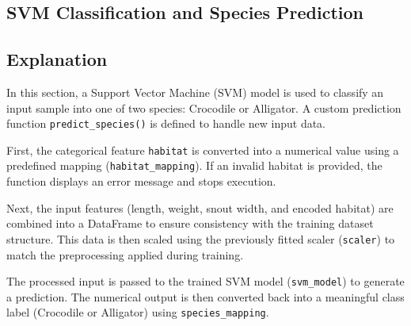 \documentclass[11pt]{article}
\begin{document}
\subsection{SVM Classification and Species Prediction}
\subsection*{Explanation}

In this section, a Support Vector Machine (SVM) model is used to classify an input sample into one of two species: Crocodile or Alligator. A custom prediction function \texttt{predict\_species()} is defined to handle new input data.

First, the categorical feature \texttt{habitat} is converted into a numerical value using a predefined mapping (\texttt{habitat\_mapping}). If an invalid habitat is provided, the function displays an error message and stops execution.

Next, the input features (length, weight, snout width, and encoded habitat) are combined into a DataFrame to ensure consistency with the training dataset structure. This data is then scaled using the previously fitted scaler (\texttt{scaler}) to match the preprocessing applied during training.

The processed input is passed to the trained SVM model (\texttt{svm\_model}) to generate a prediction. The numerical output is then converted back into a meaningful class label (Crocodile or Alligator) using \texttt{species\_mapping}.
\end{document}
